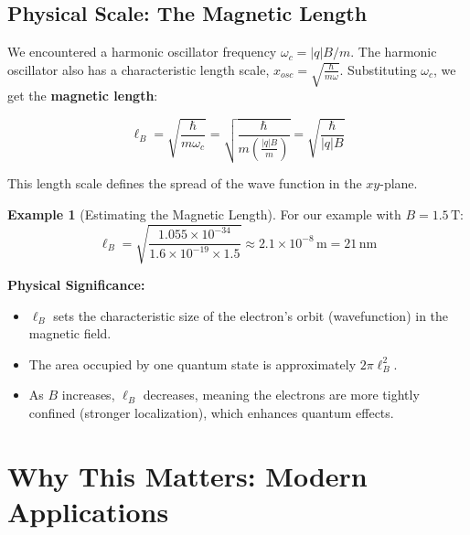 \documentclass[11pt,a4paper]{article}
\let\oldsection\section
\renewcommand{\section}{\needspace{5\baselineskip}\oldsection}
\let\oldsubsection\subsection
\renewcommand{\subsection}{\needspace{4\baselineskip}\oldsubsection}
\theoremstyle{definition}
\newtheorem{example}{Example}[section]
\theoremstyle{remark}
\begin{document}
\subsection{Physical Scale: The Magnetic Length}

We encountered a harmonic oscillator frequency $\omega_c = |q|B/m$. The harmonic oscillator also has a characteristic length scale, $x_{osc} = \sqrt{\frac{\hbar}{m\omega}}$. Substituting $\omega_c$, we get the \textbf{magnetic length}:

\begin{equation}
    \ell_B = \sqrt{\frac{\hbar}{m\omega_c}} = \sqrt{\frac{\hbar}{m\left(\frac{|q|B}{m}\right)}} = \sqrt{\frac{\hbar}{|q|B}}
\end{equation}

This length scale defines the spread of the wave function in the $xy$-plane.

\begin{example}[Estimating the Magnetic Length]
For our example with $B = 1.5\,\text{T}$:
\begin{equation}
    \ell_B = \sqrt{\frac{1.055 \times 10^{-34}}{1.6 \times 10^{-19} \times 1.5}} \approx 2.1 \times 10^{-8}\,\text{m} = 21\,\text{nm}
\end{equation}
\end{example}

\begin{insight}
\textbf{Physical Significance:}
\begin{itemize}
    \item $\ell_B$ sets the characteristic size of the electron's orbit (wavefunction) in the magnetic field.
    \item The area occupied by one quantum state is approximately $2\pi\ell_B^2$.
    \item As $B$ increases, $\ell_B$ decreases, meaning the electrons are more tightly confined (stronger localization), which enhances quantum effects.
\end{itemize}
\end{insight}

\section{Why This Matters: Modern Applications}
\end{document}
